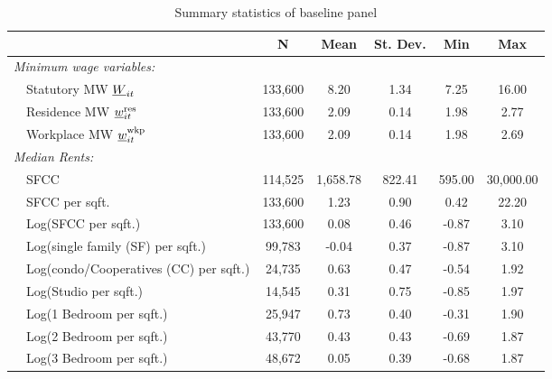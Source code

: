 \begin{table}[hbt!] \centering
    \caption{Summary statistics of baseline panel}
    \label{tab:stats_est_panel}
    \begin{tabular}{@{}lccccc@{}}
        \toprule
                                          & \multicolumn{1}{c}{N} 
                                          & \multicolumn{1}{c}{Mean} 
                                          & \multicolumn{1}{c}{St. Dev.} 
                                          & \multicolumn{1}{c}{Min} 
                                          & \multicolumn{1}{c}{Max}                 \\ \midrule
        \textit{Minimum wage variables:}              &       &       &       &       &       \\
        $\quad$Statutory MW $\underline{W}_{it}$                & 133,600  & 8.20  & 1.34  & 7.25  & 16.00  \\
        $\quad$Residence MW $\underline{w}^{\text{res}}_{it}$         & 133,600  & 2.09  & 0.14  & 1.98  & 2.77  \\
        $\quad$Workplace MW $\underline{w}^{\text{wkp}}_{it}$         & 133,600  & 2.09  & 0.14  & 1.98  & 2.69  \\[.3em]
        \textit{Median Rents:}                        &       &       &       &       &       \\
        $\quad$SFCC                                   & 114,525  & 1,658.78  & 822.41  & 595.00  & 30,000.00  \\
        $\quad$SFCC per sqft.                         & 133,600  & 1.23  & 0.90  & 0.42  & 22.20  \\
        $\quad$Log(SFCC per sqft.)                    & 133,600  & 0.08  & 0.46  & -0.87  & 3.10  \\
        $\quad$Log(single family (SF) per sqft.)      & 99,783  & -0.04  & 0.37  & -0.87  & 3.10  \\
        $\quad$Log(condo/Cooperatives (CC) per sqft.) & 24,735  & 0.63  & 0.47  & -0.54  & 1.92  \\
        $\quad$Log(Studio per sqft.)                  & 14,545  & 0.31  & 0.75  & -0.85  & 1.97  \\
        $\quad$Log(1 Bedroom per sqft.)               & 25,947  & 0.73  & 0.40  & -0.31  & 1.90  \\
        $\quad$Log(2 Bedroom per sqft.)               & 43,770  & 0.43  & 0.43  & -0.69  & 1.87  \\
        $\quad$Log(3 Bedroom per sqft.)               & 48,672  & 0.05  & 0.39  & -0.68  & 1.87  \\

\end{tabular}
\end{table}
